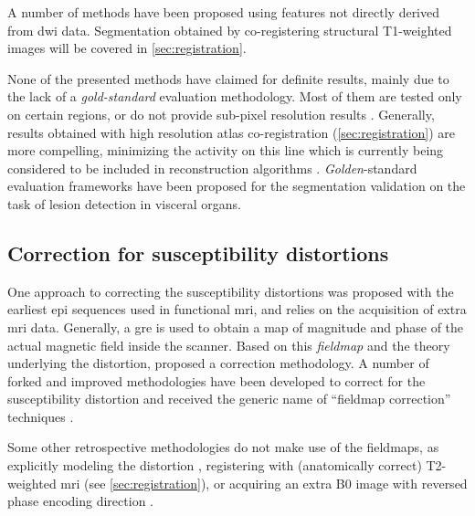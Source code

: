A number of methods have been proposed using features not directly derived from \gls{dwi} data.
Segmentation obtained by co-registering structural T1-weighted images will be covered in 
\autoref{sec:registration}. 

None of the presented methods have claimed for definite results, mainly due to the lack of 
a \emph{gold-standard} evaluation methodology. Most of them are tested only on certain
regions, or do not provide sub-pixel resolution results
\citep{hadjiprocopis_unbiased_2005,liu_brain_2007,awate_multivariate_2008,lu_segmentation_2008,
han_experimental_2009}. Generally, results obtained with high resolution atlas co-registration
(\autoref{sec:registration}) are more compelling, minimizing the activity on this line which is 
currently being considered to be included in reconstruction algorithms 
\citep{kumazawa_improvement_2013}. \emph{Golden}-standard evaluation frameworks have been 
proposed for the segmentation validation \citep{jha_task-based_2012} on the task of lesion 
detection in visceral organs.  

\subsection{Correction for susceptibility distortions}
\label{sec:distortion}

One approach to correcting the susceptibility distortions was proposed
with the earliest \gls{epi} sequences used in functional \gls{mri}, and
relies on the acquisition of extra \gls{mri} data. Generally, a \gls{gre} is used to 
obtain a map of magnitude and phase of the actual magnetic field inside the
scanner. Based on this \emph{fieldmap} and the theory underlying the 
distortion, \citep{jezzard_characterization_2005} proposed a correction 
methodology. A number of forked and improved methodologies have been 
developed to correct for the susceptibility distortion and received the
generic name of ``fieldmap correction'' techniques \cite{hsu_correction_2009,
reber_correction_2005}.

Some other retrospective methodologies do not make use of the fieldmaps, 
as explicitly modeling the distortion \citep{andersson_modeling_2001},
registering with (anatomically correct) T2-weighted \gls{mri} 
\citep{kybic_unwarping_2000,studholme_accurate_2000,li_accounting_2007,
tao_variational_2009} (see \autoref{sec:registration}), or acquiring an 
extra B0 image with reversed phase encoding direction 
\citep{andersson_how_2003,holland_efficient_2010}.

